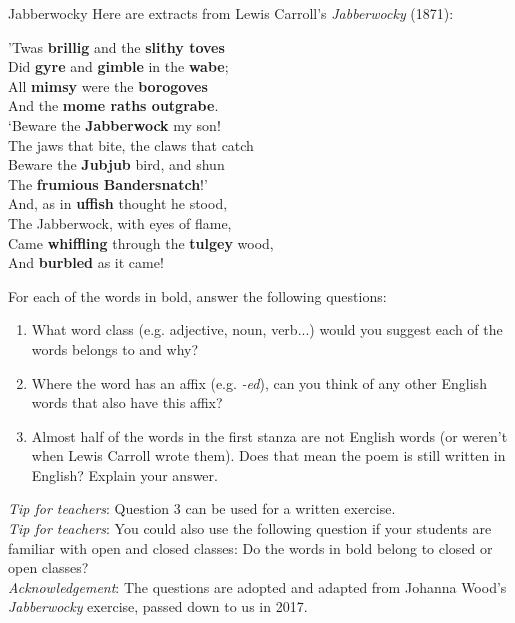 \begin{exercises}{Jabberwocky}\label{jabberwocky}
Here are extracts from Lewis Carroll's \emph{Jabberwocky} (1871):

\begin{center}
'Twas \textbf{brillig} and the \textbf{slithy toves}\\
Did \textbf{gyre} and \textbf{gimble} in the \textbf{wabe};\\
All \textbf{mimsy} were the \textbf{borogoves}\\
And the \textbf{mome raths outgrabe}.\\
 
‘Beware the \textbf{Jabberwock} my son!\\
The jaws that bite, the claws that catch\\
Beware the \textbf{Jubjub} bird, and shun\\
The \textbf{frumious Bandersnatch}!'\\

And, as in \textbf{uffish} thought he stood,\\
The Jabberwock, with eyes of flame,\\
Came \textbf{whiffling} through the \textbf{tulgey} wood,\\
And \textbf{burbled} as it came!\\
\end{center}

\noindent For each of the words in bold, answer the following questions:

\begin{enumerate}
    \item What word class (e.g. adjective, noun, verb...) would you suggest each of the words belongs to and why?
    \item Where the word has an affix (e.g. \emph{-ed}), can you think of any other English words that also have this affix?
    \item Almost half of the words in the first stanza are not English words (or weren't when Lewis Carroll wrote them). Does that mean the poem is still written in English? Explain your answer.
\end{enumerate}

\noindent \emph{Tip for teachers}: Question 3 can be used for a written exercise.\\

\noindent \emph{Tip for teachers}: You could also use the following question if your students are familiar with open and closed classes: Do the words in bold belong to closed or open classes?\\  

\noindent \emph{Acknowledgement}: The questions are adopted and adapted from Johanna Wood's \emph{Jabberwocky} exercise, passed down to us in 2017.

\end{exercises}

